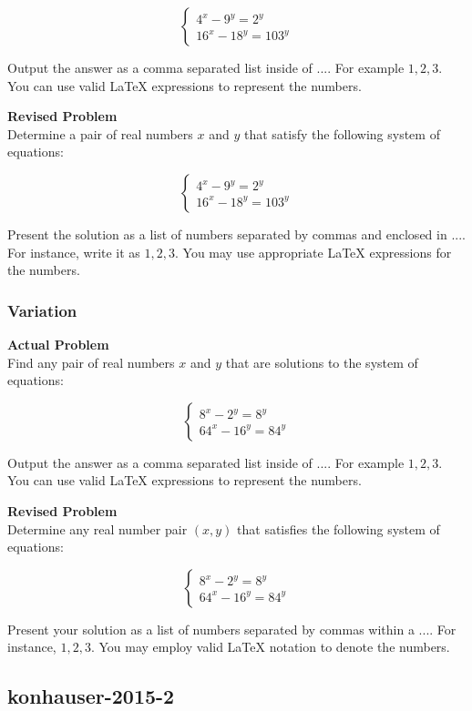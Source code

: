 $$
\begin{cases}
4^x - 9^y = 2^y \\
16^x - 18^y = 103^y
\end{cases}
$$


Output the answer as a comma separated list inside of $\boxed{...}$. For example $\boxed{1, 2, 3}$.
You can use valid LaTeX expressions to represent the numbers.

\textbf{Revised Problem}\\
Determine a pair of real numbers \(x\) and \(y\) that satisfy the following system of equations:

$$
\begin{cases}
4^x - 9^y = 2^y \\
16^x - 18^y = 103^y
\end{cases}
$$

Present the solution as a list of numbers separated by commas and enclosed in $\boxed{...}$. For instance, write it as $\boxed{1, 2, 3}$. You may use appropriate LaTeX expressions for the numbers.

\subsubsection{Variation}
\textbf{Actual Problem}\\
Find any pair of real numbers $x$ and $y$ that are solutions to the system of equations:

$$
\begin{cases}
8^x - 2^y = 8^y \\
64^x - 16^y = 84^y
\end{cases}
$$


Output the answer as a comma separated list inside of $\boxed{...}$. For example $\boxed{1, 2, 3}$.
You can use valid LaTeX expressions to represent the numbers.

\textbf{Revised Problem}\\
Determine any real number pair $(x, y)$ that satisfies the following system of equations:

$$
\begin{cases}
8^x - 2^y = 8^y \\
64^x - 16^y = 84^y
\end{cases}
$$

Present your solution as a list of numbers separated by commas within a $\boxed{...}$. For instance, $\boxed{1, 2, 3}$. You may employ valid LaTeX notation to denote the numbers.

\subsection{konhauser-2015-2}
